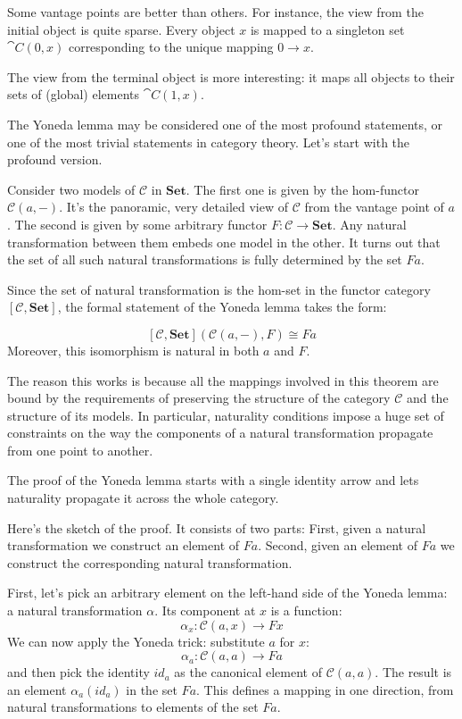 \documentclass[DaoFP]{subfiles}
\begin{document}
Some vantage points are better than others. For instance, the view from the initial object is quite sparse. Every object $x$ is mapped to a singleton set $\cat C(0, x)$ corresponding to the unique mapping $0 \to x$. 

The view from the terminal object is more interesting: it maps all objects to their sets of (global) elements $\cat C(1, x)$. 

The Yoneda lemma may be considered one of the most profound statements, or one of the most trivial statements in category theory. Let's start with the profound version. 

Consider two models of $\mathcal{C}$ in $\mathbf{Set}$. The first one is given by the hom-functor  $\mathcal{C}(a, -)$. It's the panoramic, very detailed view of $\mathcal{C}$ from the vantage point of $a$. The second is given by some arbitrary functor $F \colon \mathcal{C} \to \mathbf{Set}$. Any natural transformation between them embeds one model in the other. It turns out that the set of all such natural transformations is fully determined by the set $F a$.

Since the set of natural transformation is the hom-set in the functor category $[\mathcal{C}, \mathbf{Set}]$, the formal statement of the Yoneda lemma takes the form:

\[ [\mathcal{C}, \mathbf{Set}]( \mathcal{C}(a, -), F) \cong F a \]
Moreover, this isomorphism is natural in both $a$ and $F$.

The reason this works is because all the mappings involved in this theorem are bound by the requirements of preserving the structure of the category $\mathcal{C}$ and the structure of its models. In particular, naturality conditions impose a huge set of constraints on the way the components of a natural transformation propagate from one point to another. 

The proof of the Yoneda lemma starts with a single identity arrow and lets naturality propagate it across the whole category.

Here's the sketch of the proof. It consists of two parts: First, given a natural transformation we construct an element of $F a$. Second, given an element of $F a$ we construct the corresponding natural transformation. 

First, let's pick an arbitrary element on the left-hand side of the Yoneda lemma: a natural transformation $\alpha$. Its component at $x$ is a function:
\[ \alpha_x \colon \mathcal{C}(a, x) \to F x \]
We can now apply the Yoneda trick: substitute $a$ for $x$:
\[ \alpha_a \colon \mathcal{C}(a, a) \to F a \]
and then pick the identity $id_a$ as the canonical element of $\mathcal{C}(a, a)$. The result is an element $\alpha_a (id_a)$ in the set $F a$. This defines a mapping in one direction, from natural transformations to elements of the set $F a$.
\end{document}
